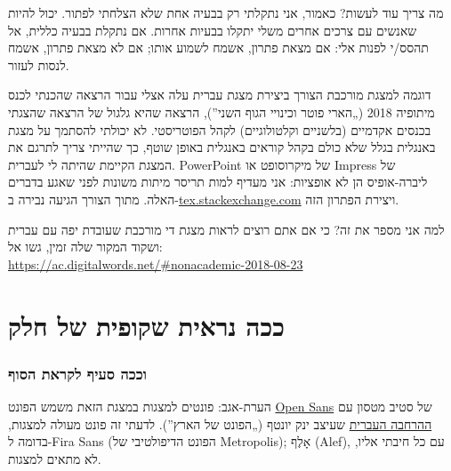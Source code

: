 \documentclass{beamer}
\newcommand*\smallurl[1]{{\scriptsize\url{#1}}}
\begin{document}
	
	\begin{frame}{מה צריך עוד לעשות?}
		כאמור, אני נתקלתי רק בבעיה אחת שלא הצלחתי לפתור. יכול להיות שאנשים עם צרכים אחרים משלי יתקלו בבעיות אחרות. אם נתקלת בבעיה כללית, אל תהסס/י לפנות אלי: אם מצאת פתרון, אשמח לשמוע אותו; אם לא מצאת פתרון, אשמח לנסות לעזור.
	\end{frame}
	
	
	\begin{frame}{דוגמה למצגת מורכבת}
		הצורך ביצירת מצגת עברית עלה אצלי עבור הרצאה שהכנתי לכנס מיתופיה 2018 („הארי פוטר וכינויי הגוף השני”), הרצאה שהיא גלגול של הרצאה שהצגתי בכנסים אקדמיים (בלשניים וקלטולוגיים) לקהל הפוטריסטי. לא יכולתי להסתמך על מצגת באנגלית בגלל שלא כולם בקהל קוראים באנגלית באופן שוטף, כך שהייתי צריך לתרגם את המצגת הקיימת שהיתה לי לעברית. PowerPoint של מיקרוסופט או Impress של ליברה-אופיס הן לא אופציות: אני מעדיף למות תריסר מיתות משונות לפני שאגע בדברים האלה. מתוך הצורך הגיעה נבירה ב-\url{tex.stackexchange.com} ויצירת הפתרון הזה.
		
		למה אני מספר את זה? כי אם אתם רוצים לראות מצגת די מורכבת שעובדת יפה עם עברית ושקוד המקור שלה זמין, גשו אל:\\
		\smallurl{https://ac.digitalwords.net/\#nonacademic-2018-08-23}
	\end{frame}
	
	
	
	\part{ככה נראית שקופית של חלק}
	\frame{\partpage}
	
	\section{וככה סעיף לקראת הסוף}
	
	\begin{frame}{הערת-אגב: פונטים למצגות}
		במצגת הזאת משמש הפונט \href{https://en.wikipedia.org/wiki/Open_Sans}{Open Sans} של סטיב מטסון עם \href{https://yaronimus.wordpress.com/2014/01/19/\%D7\%90\%D7\%95\%D7\%A4\%D7\%9F-\%D7\%A1\%D7\%90\%D7\%A0\%D7\%A1-\%D7\%92\%D7\%95\%D7\%A4\%D7\%9F-\%D7\%A8\%D7\%A9\%D7\%AA-\%D7\%97\%D7\%99\%D7\%A0\%D7\%9E\%D7\%99-\%D7\%91\%D7\%A2\%D7\%99\%D7\%A6\%D7\%95\%D7\%91\%D7\%95-\%D7\%A9\%D7\%9C-\%D7\%99\%D7\%90/}{ההרחבה העברית} שעיצב ינק יונטף („הפונט של הארץ”).
		לדעתי זה פונט מעולה למצגות, בדומה ל-Fira Sans (הפונט הדיפולטיבי של Metropolis); $\mbox{אָלֶף}$ (Alef), עם כל חיבתי אליו, לא מתאים למצגות.
	\end{frame}
\end{document}
